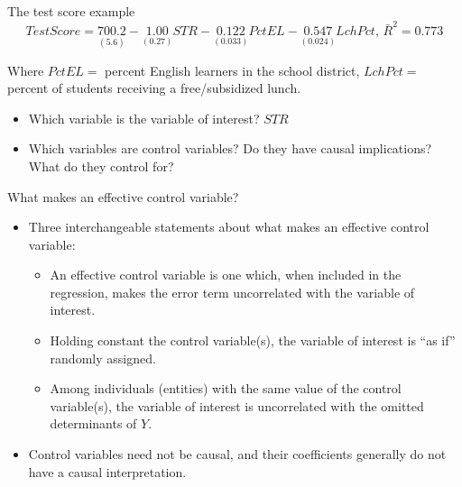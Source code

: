 \documentclass[presentation,10pt]{beamer}
\begin{document}
\begin{frame}[label={sec:orgbd390e1}]{The test score example}
\[TestScore = \underset{(5.6)}{700.2} - \underset{(0.27)}{1.00}STR -
\underset{(0.033)}{0.122}PctEL - \underset{(0.024)}{0.547}LchPct,\,
\bar{R}^2 = 0.773 \]

Where \(PctEL=\) percent English learners in the school district,
\(LchPct=\) percent of students receiving a free/subsidized lunch.

\begin{itemize}
\item Which variable is the variable of interest? \(STR\)
\item Which variables are control variables? Do they have causal
implications? What do they control for?
\end{itemize}
\end{frame}

\begin{frame}[label={sec:org86cdee4}]{What makes an effective control variable?}
\begin{itemize}
\item Three interchangeable statements about what makes an effective control
variable:
\begin{itemize}
\item An effective control variable is one which, when included in
the regression, makes the error term uncorrelated with the variable of
interest.
\item Holding constant the control variable(s), the variable of interest
is “as if” randomly assigned.
\item Among individuals (entities) with the same value of the control
variable(s), the variable of interest is uncorrelated with the
omitted determinants of \(Y\).
\end{itemize}

\item Control variables need not be causal, and their coefficients
generally do not have a causal interpretation.
\end{itemize}
\end{frame}
\end{document}
